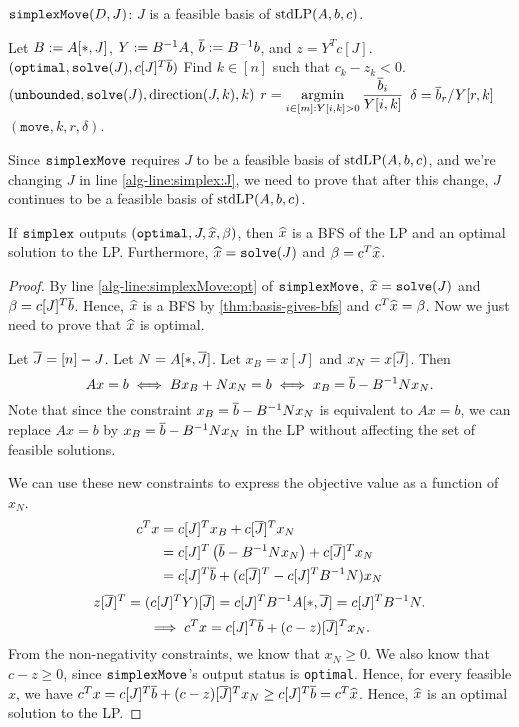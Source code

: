 \begin{algorithm}[H]
\caption{$\operatorname{\mathtt{simplexMove}}(D, J)$:
$J$ is a feasible basis of $\operatorname{stdLP}(A, b, c)$.}
\begin{algorithmic}[1]
\State Let $B := A[*, J]$, $Y := B^{-1}A$, $\overline{b} := B^{-1}b$, and $z = Y^Tc[J]$.
    \State\label{alg-line:simplexMove:opt}\Return $(\mathtt{optimal}, \operatorname{\mathtt{solve}}(J), c[J]^T\overline{b})$
\EndIf
\State Find $k \in [n]$ such that $c_k - z_k < 0$.
\label{alg-line:simplexMove:Y-neg}
    \State\label{alg-line:simplexMove:unb}%
\Return $(\mathtt{unbounded}, \operatorname{\mathtt{solve}}(J), \operatorname{direction}(J, k), k)$
\EndIf
\State $\displaystyle r = \operatorname*{argmin}_{i \in [m]: Y[i, k] > 0} \frac{\overline{b}_i}{Y[i, k]}$
\State $\delta = \overline{b}_r/Y[r, k]$
\State \Return $(\mathtt{move}, k, r, \delta)$.
\end{algorithmic}
\label{algo:simplexMove}
\end{algorithm}

Since $\operatorname{\mathtt{simplexMove}}$ requires $J$ to be a feasible basis of $\operatorname{stdLP}(A, b, c)$,
and we're changing $J$ in line \ref{alg-line:simplex:J}, we need to prove
that after this change, $J$ continues to be a feasible basis of $\operatorname{stdLP}(A, b, c)$.

\begin{theorem}
\label{thm:simplex-optimal}
If $\operatorname{\mathtt{simplex}}$ outputs $(\mathtt{optimal}, J, \widehat{x}, \beta)$,
then $\widehat{x}$ is a BFS of the LP and an optimal solution to the LP.
Furthermore, $\widehat{x} = \operatorname{\mathtt{solve}}(J)$ and $\beta = c^T\widehat{x}$.
\end{theorem}
\begin{proof}
By line \ref{alg-line:simplexMove:opt} of $\operatorname{\mathtt{simplexMove}}$,
$\widehat{x} = \operatorname{\mathtt{solve}}(J)$ and $\beta = c[J]^T\overline{b}$.
Hence, $\widehat{x}$ is a BFS by \cref{thm:basis-gives-bfs} and $c^T\widehat{x} = \beta$.
Now we just need to prove that $\widehat{x}$ is optimal.

Let $\overline{J} = [n] - J$. Let $N = A[*,\overline{J}]$.
Let $x_B = x[J]$ and $x_N = x[\overline{J}]$. Then
\[ Ax = b \iff Bx_B + Nx_N = b \iff x_B = \overline{b} - B^{-1}Nx_N. \]
Note that since the constraint $x_B = \overline{b} - B^{-1}Nx_N$ is equivalent to $Ax = b$,
we can replace $Ax = b$ by $x_B = \overline{b} - B^{-1}Nx_N$ in the LP without affecting
the set of feasible solutions.

We can use these new constraints to express the objective value as a function of $x_N$.
\begin{align*}
c^Tx &= c[J]^Tx_B + c[\overline{J}]^Tx_N
\\ &= c[J]^T\left(\overline{b} - B^{-1}Nx_N\right) + c[\overline{J}]^Tx_N
\\ &= c[J]^T\overline{b} + (c[\overline{J}]^T - c[J]^TB^{-1}N)x_N
\end{align*}
\[ z[\overline{J}]^T = (c[J]^TY)[\overline{J}] = c[J]^TB^{-1}A[*,\overline{J}] = c[J]^TB^{-1}N. \]
\[ \implies c^Tx = c[J]^T\overline{b} + (c-z)[\overline{J}]^Tx_N. \]
From the non-negativity constraints, we know that $x_N \ge 0$.
We also know that $c-z \ge 0$, since $\operatorname{\mathtt{simplexMove}}$'s output status is \texttt{optimal}.
Hence, for every feasible $x$, we have
$c^Tx = c[J]^T\overline{b} + (c-z)[\overline{J}]^Tx_N \ge c[J]^T\overline{b} = c^T\widehat{x}$.
Hence, $\widehat{x}$ is an optimal solution to the LP.
\end{proof}


